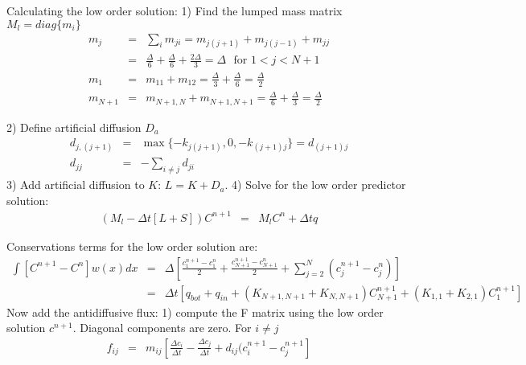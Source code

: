 Calculating the low order solution:
1) Find the lumped mass matrix $M_l = diag\{m_i\}$
\begin{eqnarray}
m_j & = & \sum_i m_{ji} = m_{j(j+1)} + m_{j(j-1)} + m_{jj} \nonumber
\\
 & = & \frac{\Delta}{6} + \frac{\Delta}{6} + \frac{2\Delta}{3} =
 \Delta \ \ \ \mbox{for }1 < j < N+1 \nonumber \\
m_1 & = & m_{11} + m_{12} = \frac{\Delta}{3} + \frac{\Delta}{6} =
\frac{\Delta}{2} \nonumber \\
m_{N+1} & = & m_{N+1,N} + m_{N+1,N+1} = \frac{\Delta}{6} + \frac{\Delta}{3} =
\frac{\Delta}{2}
\end{eqnarray}

2) Define artificial diffusion $D_a$
\begin{eqnarray}
d_{j,(j+1)} & = & \max\{ -k_{j(j+1)},0,-k_{(j+1)j}\} = d_{(j+1)j}
\nonumber \\
d_{jj} & = & -\sum_{i\neq j} d_{ji}
\end{eqnarray}
3) Add artificial diffusion to $K$: $L = K + D_a$. 4) Solve for the low order predictor solution:
\begin{eqnarray}
(M_l -\Delta t [L+S])C^{n+1} & = & M_l C^{n} + \Delta t q
\end{eqnarray}


Conservations terms for the low order solution are:
\begin{eqnarray}
\int \left[C^{n+1} -C^{n}\right] w(x)dx & = &
 \Delta \left[\frac{c^{n+1}_1-c^{n}_1}{2} +
   \frac{c^{n+1}_{N+1}-c^{n}_{N+1}}{2} + \sum_{j =
     2}^{N}(c^{n+1}_{j}-c^{n}_{j})\right] \nonumber \\
&  = &   \Delta t \left[ q_{bot} +
q_{in} + (K_{N+1,N+1}+ K_{N,N+1} )C^{n+1}_{N+1} + (K_{1,1} +
K_{2,1})C^{n+1}_{1}\right]  \nonumber
\end{eqnarray}
Now add the antidiffusive flux:
1) compute the F matrix using the low order solution $c^{n+1}$.  Diagonal components are zero.  For $i \neq j$
\begin{eqnarray}
f_{ij} & = & m_{ij}\left[\frac{\Delta c_i}{\Delta t} - \frac{\Delta
    c_j}{\Delta t} + d_{ij}(c^{n+1}_i - c^{n+1}_j\right]
\end{eqnarray}
